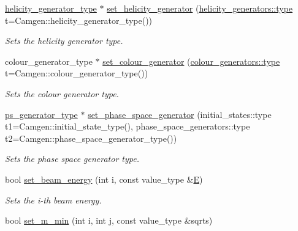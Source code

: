 \begin{DoxyCompactItemize}
\hypertarget{a00430_a62fb34d1428464dcc63f9b2360da2ddb}{\hyperlink{a00266}{helicity\-\_\-generator\-\_\-type} $\ast$ \hyperlink{a00430_a62fb34d1428464dcc63f9b2360da2ddb}{set\-\_\-helicity\-\_\-generator} (\hyperlink{a00270_a8481232150a01996d5ca4035ea902c31}{helicity\-\_\-generators\-::type} t=Camgen\-::helicity\-\_\-generator\-\_\-type())}\label{a00430_a62fb34d1428464dcc63f9b2360da2ddb}

\begin{DoxyCompactList}\small\item\em Sets the helicity generator type. \end{DoxyCompactList}\item 
\hypertarget{a00430_ab78115c2eaef8985f25a4d14d291bb5c}{colour\-\_\-generator\-\_\-type $\ast$ \hyperlink{a00430_ab78115c2eaef8985f25a4d14d291bb5c}{set\-\_\-colour\-\_\-generator} (\hyperlink{a00088_af5ebbb0f77f0cac3c4959f2a880a2f1c}{colour\-\_\-generators\-::type} t=Camgen\-::colour\-\_\-generator\-\_\-type())}\label{a00430_ab78115c2eaef8985f25a4d14d291bb5c}

\begin{DoxyCompactList}\small\item\em Sets the colour generator type. \end{DoxyCompactList}\item 
\hypertarget{a00430_ac619059ba6cc064e1afe0d3899d904e8}{\hyperlink{a00441}{ps\-\_\-generator\-\_\-type} $\ast$ \hyperlink{a00430_ac619059ba6cc064e1afe0d3899d904e8}{set\-\_\-phase\-\_\-space\-\_\-generator} (initial\-\_\-states\-::type t1=Camgen\-::initial\-\_\-state\-\_\-type(), phase\-\_\-space\-\_\-generators\-::type t2=Camgen\-::phase\-\_\-space\-\_\-generator\-\_\-type())}\label{a00430_ac619059ba6cc064e1afe0d3899d904e8}

\begin{DoxyCompactList}\small\item\em Sets the phase space generator type. \end{DoxyCompactList}\item 
\hypertarget{a00430_ae033e78f0e905e357bfae4a735ca79b1}{bool \hyperlink{a00430_ae033e78f0e905e357bfae4a735ca79b1}{set\-\_\-beam\-\_\-energy} (int i, const value\-\_\-type \&\hyperlink{a00442_a8a2e0cd9b961dcfa2eb1ac7426cf3f5f}{E})}\label{a00430_ae033e78f0e905e357bfae4a735ca79b1}

\begin{DoxyCompactList}\small\item\em Sets the i-\/th beam energy. \end{DoxyCompactList}\item 
\hypertarget{a00430_a055a05d4ac50c5c220ada4d04ce41710}{bool \hyperlink{a00430_a055a05d4ac50c5c220ada4d04ce41710}{set\-\_\-m\-\_\-min} (int i, int j, const value\-\_\-type \&sqrts)}\label{a00430_a055a05d4ac50c5c220ada4d04ce41710}


\end{DoxyCompactItemize}
